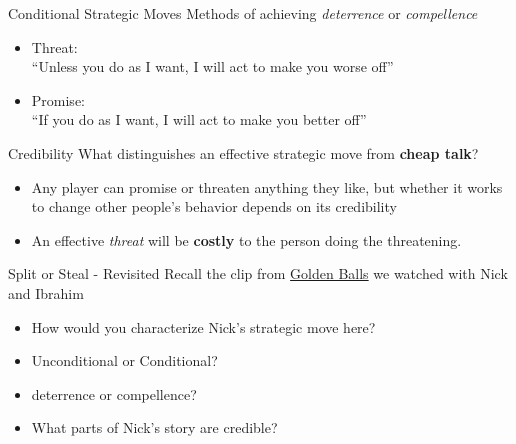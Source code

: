 
\begin{frame}{Conditional Strategic Moves}
  Methods of achieving \textit{deterrence} or \textit{compellence} 
  \begin{itemize}
    \item \alert{Threat}: \\
    ``Unless you do as I want, I will act to make you worse off''
    \item \alert{Promise}: \\
    ``If you do as I want, I will act to make you better off''
  \end{itemize}
\end{frame}


\begin{frame}{Credibility}
  What distinguishes an effective strategic move from \textbf{cheap talk}?
  \begin{itemize}
    \item Any player can promise or threaten anything they like, 
    but whether it works to change other people's behavior depends on its \alert{credibility}
    \item An effective \textit{threat} will be \textbf{costly} to the person doing the threatening.
  \end{itemize}
\end{frame}


\begin{frame}{Split or Steal - Revisited}
  Recall the clip from \href{https://youtu.be/S0qjK3TWZE8}{Golden Balls} we watched with Nick and Ibrahim 
  \begin{itemize}
    \item How would you characterize Nick's strategic move here? 
    \item \alert{Unconditional} or \alert{Conditional}?
    \item \alert{deterrence} or \alert{compellence}?
    \item What parts of Nick's story are \alert{credible}?
  \end{itemize}
\end{frame}

